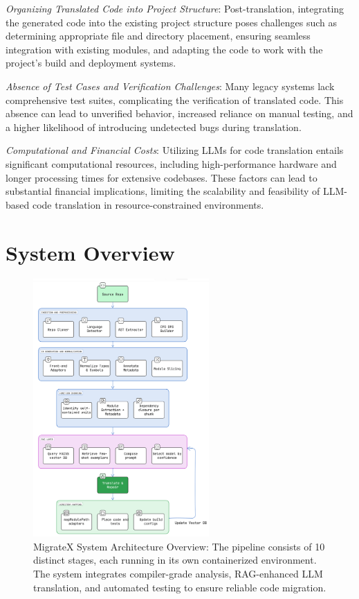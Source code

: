 \documentclass[twocolumn]{article}
\begin{document}
   \textit{Organizing Translated Code into Project Structure}: Post-translation, integrating the generated code into the existing project structure poses challenges such as determining appropriate file and directory placement, ensuring seamless integration with existing modules, and adapting the code to work with the project's build and deployment systems.

   \textit{Absence of Test Cases and Verification Challenges}: Many legacy systems lack comprehensive test suites, complicating the verification of translated code. This absence can lead to unverified behavior, increased reliance on manual testing, and a higher likelihood of introducing undetected bugs during translation.

   \textit{Computational and Financial Costs}: Utilizing LLMs for code translation entails significant computational resources, including high-performance hardware and longer processing times for extensive codebases. These factors can lead to substantial financial implications, limiting the scalability and feasibility of LLM-based code translation in resource-constrained environments.

\section{System Overview}

\begin{figure}[t]
    \centering
    \includegraphics[width=0.6\textwidth]{figures/system_overview_1.png}
    \caption{{MigrateX System Architecture Overview: The pipeline consists of 10 distinct stages, each running in its own containerized environment. The system integrates compiler-grade analysis, RAG-enhanced LLM translation, and automated testing to ensure reliable code migration.}}
    \label{fig:system-overview}
\end{figure}
\end{document}
